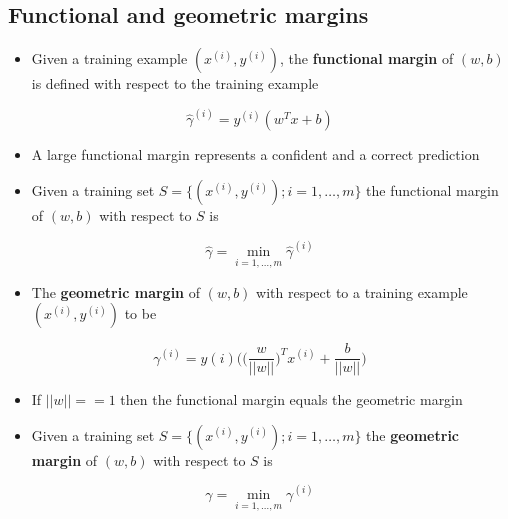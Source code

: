 \documentclass[11pt]{article}
\begin{document}
\subsection{Functional and geometric margins}
\label{sec:orgb267d89}
\begin{itemize}
\item Given a training example \((x^{(i)},y^{(i)})\), the \textbf{functional margin} of \((w,b)\) is defined with respect to the training example
\end{itemize}
\begin{equation}
  \hat \gamma^{(i)}=y^{(i)}(w^Tx+b)
\end{equation}
\begin{itemize}
\item A large functional margin represents a confident and a correct prediction
\item Given a training set \(S = \{(x^{(i)},y^{(i)}); i=1,\dots,m\}\) the functional margin of \((w,b)\) with respect to \(S\) is
\end{itemize}
\begin{equation}
  \hat \gamma = ‎‎‎‎‎‎\min_{i=1,\dots,m} \hat \gamma^{(i)}
\end{equation}

\begin{itemize}
\item The \textbf{geometric margin} of \((w,b)\) with respect to a training example \((x^{(i)},y^{(i)})\) to be
\end{itemize}
\begin{equation}
	\gamma^{(i)} = y{(i)} \Bigg( \bigg( \frac w{||w||} \bigg)^T x^{(i)} + \frac b{||w||}  \Bigg)
\end{equation}
\begin{itemize}
\item If \(||w|| == 1\) then the functional margin equals the geometric margin
\item Given a training set \(S = \{(x^{(i)},y^{(i)}); i=1,\dots,m\}\) the \textbf{geometric margin} of \((w,b)\) with respect to \(S\) is
\end{itemize}
\begin{equation}
	\gamma = ‎‎‎‎‎‎\min_{i=1,\dots,m} \gamma^{(i)}
\end{equation}
\end{document}
